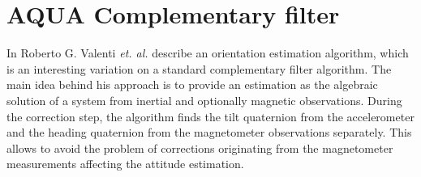 \section{AQUA Complementary filter}

In \cite{Valenti-AQUA} Roberto G. Valenti \textit{et. al.} describe an orientation estimation algorithm, which is an interesting variation on a standard complementary filter algorithm. The main idea behind his approach is to provide an estimation as the algebraic solution of a system from inertial and optionally magnetic observations. %
During the correction step, the algorithm finds the tilt quaternion from the accelerometer and the heading quaternion from the magnetometer observations separately. This allows to avoid the problem of corrections originating from the magnetometer measurements affecting the attitude estimation.

